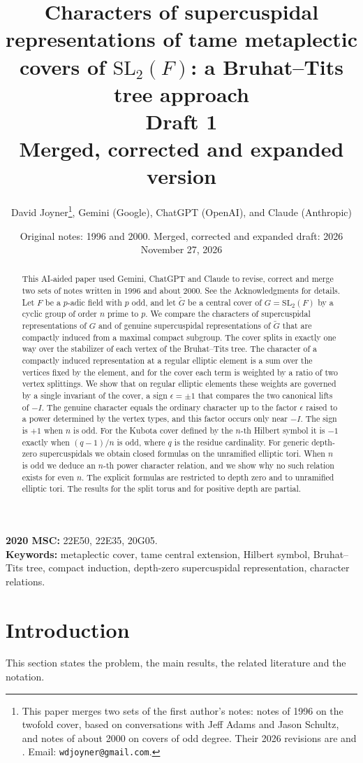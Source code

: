 \documentclass[12pt,letterpaper]{article}
\title{Characters of supercuspidal representations of tame metaplectic covers of $\mathrm{SL}_2(F)$: a Bruhat--Tits tree approach\\[.5ex]\large Draft 1\\Merged, corrected and expanded version}
\author{David Joyner\thanks{This paper merges two sets of the first author's notes: notes of 1996 on the twofold cover, based on conversations with Jeff Adams and Jason Schultz, and notes of about 2000 on covers of odd degree. Their 2026 revisions are \cite{Jo26b} and \cite{Jo26a}. Email: \texttt{wdjoyner@gmail.com}.}, Gemini (Google), ChatGPT (OpenAI), and Claude (Anthropic)}
\date{Original notes: 1996 and 2000. Merged, corrected and expanded draft: 2026\\November 27, 2026}
\numberwithin{equation}{section}
\theoremstyle{definition}
\theoremstyle{remark}
\newcommand{\Gt}{\widetilde G}
\newcommand{\sgn}{\epsilon}
\begin{document}
\maketitle
\begin{abstract}
This AI-aided paper used Gemini, ChatGPT and Claude to revise, correct and merge two sets of notes written in 1996 and about 2000. See the Acknowledgments for details. Let $F$ be a $p$-adic field with $p$ odd, and let $\Gt$ be a central cover of $G=\mathrm{SL}_2(F)$ by a cyclic group of order $n$ prime to $p$. We compare the characters of supercuspidal representations of $G$ and of genuine supercuspidal representations of $\Gt$ that are compactly induced from a maximal compact subgroup. The cover splits in exactly one way over the stabilizer of each vertex of the Bruhat--Tits tree. The character of a compactly induced representation at a regular elliptic element is a sum over the vertices fixed by the element, and for the cover each term is weighted by a ratio of two vertex splittings. We show that on regular elliptic elements these weights are governed by a single invariant of the cover, a sign $\sgn=\pm1$ that compares the two canonical lifts of $-I$. The genuine character equals the ordinary character up to the factor $\sgn$ raised to a power determined by the vertex types, and this factor occurs only near $-I$. The sign is $+1$ when $n$ is odd. For the Kubota cover defined by the $n$-th Hilbert symbol it is $-1$ exactly when $(q-1)/n$ is odd, where $q$ is the residue cardinality. For generic depth-zero supercuspidals we obtain closed formulas on the unramified elliptic tori. When $n$ is odd we deduce an $n$-th power character relation, and we show why no such relation exists for even $n$. The explicit formulas are restricted to depth zero and to unramified elliptic tori. The results for the split torus and for positive depth are partial.
\end{abstract}
\noindent\textbf{2020 MSC:} 22E50, 22E35, 20G05.\\
\textbf{Keywords:} metaplectic cover, tame central extension, Hilbert symbol, Bruhat--Tits tree, compact induction, depth-zero supercuspidal representation, character relations.
\tableofcontents

\section{Introduction}\label{sec:intro}
This section states the problem, the main results, the related literature and the notation.
\end{document}
